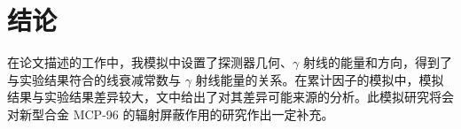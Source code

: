 \section{结论}

在论文描述的工作中，我模拟中设置了探测器几何、$\gamma$ 射线的能量和方向，得到了与实验结果符合的线衰减常数与 $\gamma$ 射线能量的关系。在累计因子的模拟中，模拟结果与实验结果差异较大，文中给出了对其差异可能来源的分析。此模拟研究将会对新型合金 MCP-96 的辐射屏蔽作用的研究作出一定补充。